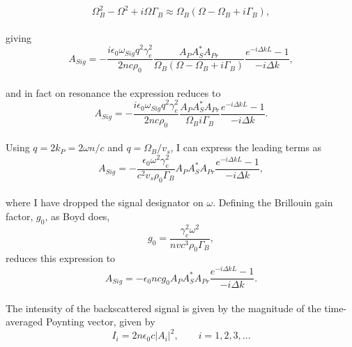 \\
\begin{equation}
\Omega_{B}^{2} - \Omega^{2} + i\Omega\Gamma_{B} \approx \Omega_{B}(\Omega - \Omega_{B} + i\Gamma_{B}),
\end{equation}
\\
giving
\\
\begin{equation}
  A_{Sig} = -\frac{i\epsilon_{0}\omega_{Sig}q^{2}\gamma_{e}^{2}}{2nc\rho_{0}}\frac{A_{P}A_{S}^{*}A_{Pr}}{\Omega_{B}(\Omega - \Omega_{B} + i\Gamma_{B})} \frac{e^{-i\Delta kL} - 1}{-i\Delta k},
  \label{eq:resonance}
\end{equation}
\\
and in fact on resonance the expression reduces to
\\
\begin{equation}
  A_{Sig} = -\frac{i\epsilon_{0}\omega_{Sig}q^{2}\gamma_{e}^{2}}{2nc\rho_{0}}\frac{A_{P}A_{S}^{*}A_{Pr}}{\Omega_{B}i\Gamma_{B}} \frac{e^{-i\Delta kL} - 1}{-i\Delta k}.
\end{equation}
\\
Using \(q = 2k_{P} = 2\omega n/c\) and \(q = \Omega_{B}/v_{s}\), I can express the leading terms as
\\
\begin{equation}
  A_{Sig} = -\frac{\epsilon_{0}\omega^{2}\gamma_{e}^{2}}{c^{2}v_{s}\rho_{0}\Gamma_{B}}A_{P}A_{S}^{*}A_{Pr} \frac{e^{-i\Delta kL} - 1}{-i\Delta k},
\end{equation}
\\
where I have dropped the signal designator on \(\omega\). Defining the Brillouin gain factor, \(g_{0}\), as Boyd does,
\\
\begin{equation}
  g_{0} = \frac{\gamma_{e}^{2}\omega^{2}}{nvc^{3}\rho_{0}\Gamma_{B}},
\end{equation}
reduces this expression to
\\
\begin{equation}
  A_{Sig} = -\epsilon_{0}ncg_{0}A_{P}A_{S}^{*}A_{Pr} \frac{e^{-i\Delta kL} - 1}{-i\Delta k}.
\end{equation}
\\
The intensity of the backscattered signal is given by the magnitude of the time-averaged Poynting vector, given by
\\
\begin{equation}
  I_{i} = 2n\epsilon_{0}c|A_{i}|^{2}, \qquad i = 1,2,3,...
\end{equation}
\\
